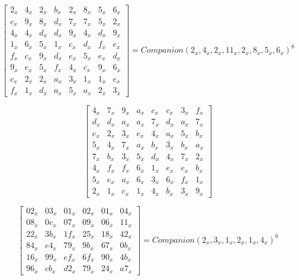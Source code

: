 \begin{equation}\label{mat:photon_a256}
  \begin{bmatrix}
  2_x & 4_x & 2_x & b_x & 2_x & 8_x & 5_x & 6_x\\
  c_x & 9_x & 8_x & d_x & 7_x & 7_x & 5_x & 2_x\\
  4_x & 4_x & d_x & d_x & 9_x & 4_x & d_x & 9_x\\
  1_x & 6_x & 5_x & 1_x & c_x & d_x & f_x & e_x\\
  f_x & c_x & 9_x & d_x & e_x & 5_x & e_x & d_x\\
  9_x & e_x & 5_x & f_x & 4_x & c_x & 9_x & 6_x\\
  c_x & 2_x & 2_x & a_x & 3_x & 1_x & 1_x & e_x\\
  f_x & 1_x & d_x & a_x & 5_x & a_x & 2_x & 3_x
  \end{bmatrix}
  =
  Companion(2_x,4_x,2_x,11_x,2_x,8_x,5_x,6_x)^8
\end{equation}

\begin{equation}\label{mat:photon_a256-inv}
  \begin{bmatrix}
  4_x & 7_x & 9_x & a_x & c_x & c_x & 3_x & f_x\\
  d_x & d_x & a_x & a_x & 7_x & d_x & a_x & 7_x\\
  e_x & 2_x & 3_x & e_x & 4_x & a_x & 5_x & b_x\\
  5_x & 4_x & 7_x & a_x & b_x & 3_x & b_x & a_x\\
  7_x & b_x & 3_x & 5_x & d_x & 4_x & 7_x & 2_x\\
  4_x & f_x & f_x & 6_x & 1_x & e_x & e_x & b_x\\
  5_x & e_x & a_x & 6_x & 3_x & 6_x & f_x & 1_x\\
  2_x & 1_x & c_x & 1_x & 4_x & b_x & 3_x & 9_x
  \end{bmatrix}
\end{equation}

\begin{equation}\label{mat:photon_a288}
  \begin{bmatrix}
  02_x & 03_x & 01_x & 02_x & 01_x & 04_x\\
  08_x & 0e_x & 07_x & 09_x & 06_x & 11_x\\
  22_x & 3b_x & 1f_x & 25_x & 18_x & 42_x\\
  84_x & e4_x & 79_x & 9b_x & 67_x & 0b_x\\
  16_x & 99_x & ef_x & 6f_x & 90_x & 4b_x\\
  96_x & cb_x & d2_x & 79_x & 24_x & a7_x
  \end{bmatrix}
  =
  Companion(2_x,3_x,1_x,2_x,1_x,4_x)^6
\end{equation}


